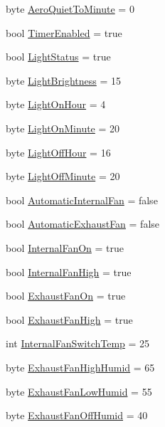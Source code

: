 \begin{DoxyCompactItemize}
\item 
byte \mbox{\hyperlink{struct_settings_a70a24474e56d2274e32f54dc42337d72}{Aero\+Quiet\+To\+Minute}} = 0
\item 
bool \mbox{\hyperlink{struct_settings_accf09a0ab1d5cc8d12f3cb9e934612bf}{Timer\+Enabled}} = true
\item 
bool \mbox{\hyperlink{struct_settings_a13f588dbe3cb994d58c32aa44e894625}{Light\+Status}} = true
\item 
byte \mbox{\hyperlink{struct_settings_ad5eba46ecc5a2c893aa92ed59357aeff}{Light\+Brightness}} = 15
\item 
byte \mbox{\hyperlink{struct_settings_a986d09e94dfbff4c6ba717d3cc51a076}{Light\+On\+Hour}} = 4
\item 
byte \mbox{\hyperlink{struct_settings_adc2a7db089da15debb65c7e6e457f09e}{Light\+On\+Minute}} = 20
\item 
byte \mbox{\hyperlink{struct_settings_ad086a1ad52a233373d8d786f2e53441c}{Light\+Off\+Hour}} = 16
\item 
byte \mbox{\hyperlink{struct_settings_ae36c9acdb2c193a39bcc85f63b94b3c0}{Light\+Off\+Minute}} = 20
\item 
bool \mbox{\hyperlink{struct_settings_ac773bfdbe0c39013b77f3df24c10c0ec}{Automatic\+Internal\+Fan}} = false
\item 
bool \mbox{\hyperlink{struct_settings_a9cdd75a68c50eec617e6602e78f123e4}{Automatic\+Exhaust\+Fan}} = false
\item 
bool \mbox{\hyperlink{struct_settings_aa804a748ef28e4c9fcd8465471793384}{Internal\+Fan\+On}} = true
\item 
bool \mbox{\hyperlink{struct_settings_a986e7961f12dc3e18e3d6f1623b692de}{Internal\+Fan\+High}} = true
\item 
bool \mbox{\hyperlink{struct_settings_ae8ca09bf2183dbcaf5d47b3e758d7955}{Exhaust\+Fan\+On}} = true
\item 
bool \mbox{\hyperlink{struct_settings_aabd6831905f2f3dcbeb08b08d18af3a3}{Exhaust\+Fan\+High}} = true
\item 
int \mbox{\hyperlink{struct_settings_aea53fdce9d489f7c66bcd0a4fc16dba0}{Internal\+Fan\+Switch\+Temp}} = 25
\item 
byte \mbox{\hyperlink{struct_settings_ae51922872fcad744ec751e36117c132e}{Exhaust\+Fan\+High\+Humid}} = 65
\item 
byte \mbox{\hyperlink{struct_settings_afba42aaf2fc61470eb823d18cf0dad61}{Exhaust\+Fan\+Low\+Humid}} = 55
\item 
byte \mbox{\hyperlink{struct_settings_ae217792a77cd103c8c0bd436122cd32c}{Exhaust\+Fan\+Off\+Humid}} = 40

\end{DoxyCompactItemize}
